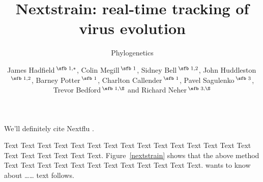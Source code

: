 \documentclass{bioinfo}
\begin{document}

\subtitle{Phylogenetics}

\title[Nextstrain]{Nextstrain: real-time tracking of virus evolution}
\author[Hadfield \textit{et~al}.]{
James Hadfield\,$^{\text{\sfb 1,}\ast}$,
Colin Megill\,$^{\text{\sfb 1}}$,
Sidney Bell\,$^{\text{\sfb 1,2}}$,
John Huddleston\,$^{\text{\sfb 1,2}}$,
Barney Potter\,$^{\text{\sfb 1}}$,
Charlton Callender\,$^{\text{\sfb 1}}$,
Pavel Sagulenko\,$^{\text{\sfb 3}}$,
Trevor Bedford\,$^{\text{\sfb 1,}\S}$ and
Richard Neher\,$^{\text{\sfb 3,}\S}$}
\address{
$^{\text{\sf 1}}$Vaccine and Infectious Disease Division, Fred Hutchinson Cancer Research Center, Seattle, WA, USA,
$^{\text{\sf 2}}$Molecular and Cellular Biology Program, University of Washington, Seattle, WA, USA and
$^{\text{\sf 3}}$Biozentrum, University of Basel, Basel, Switzerland.
}





\maketitle

We'll definitely cite Nextflu \citep{neher2015nextflu}.

Text Text Text Text Text Text  Text Text Text Text Text Text Text
Text Text  Text Text Text Text Text Text. Figure~\ref{nextstrain}
shows that the above method  Text Text Text Text  Text Text Text
Text Text Text  Text Text.  \citep{neher2015nextflu} wants to know about
{\ldots}{\ldots} text follows.
\end{document}

